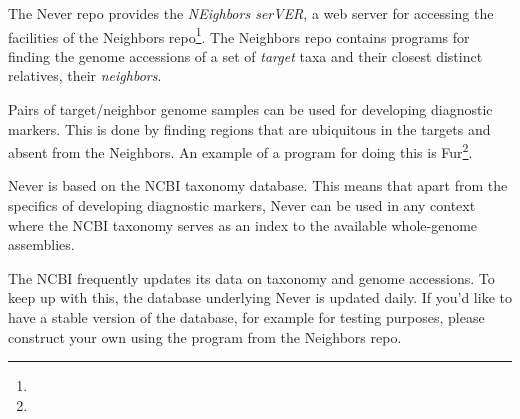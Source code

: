 The Never repo provides the \emph{NEighbors serVER}, a web server for
accessing the facilities of the Neighbors
repo\footnote{}. The Neighbors
repo contains programs for finding the genome accessions of a set of
\emph{target} taxa and their closest distinct relatives, their
\emph{neighbors}.

Pairs of target/neighbor genome samples can be used for developing
diagnostic markers. This is done by finding regions that are
ubiquitous in the targets and absent from the Neighbors. An example of
a program for doing this is
Fur\footnote{}.

Never is based on the NCBI taxonomy database. This means that apart
from the specifics of developing diagnostic markers, Never can be used
in any context where the NCBI taxonomy serves as an index to the
available whole-genome assemblies.

The NCBI frequently updates its data on taxonomy and genome
accessions. To keep up with this, the database underlying Never is
updated daily. If you'd like to have a stable version of the database,
for example for testing purposes, please construct your own using the
program  from the Neighbors repo.
